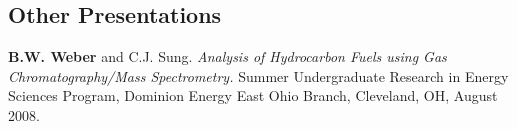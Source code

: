 \documentclass[margin,line]{res}
\newenvironment{list3}{
  \begin{list}{\ding{113}}{%
      \setlength{\itemsep}{0.1in}
      \setlength{\parsep}{0in} \setlength{\parskip}{0in}
      \setlength{\topsep}{0in} \setlength{\partopsep}{0in} 
      \setlength{\leftmargin}{0in}}}{\end{list}}
\begin{document}
\begin{resume}
\section{\sc Other Presentations}
\begin{list3}
\item[] {\bf B.W. Weber} and C.J. Sung. {\em Analysis of Hydrocarbon Fuels using Gas Chromatography/Mass Spectrometry.} Summer Undergraduate Research in Energy Sciences Program, Dominion Energy East Ohio Branch, Cleveland, OH, August 2008.
\end{list3}


\end{resume}
\end{document}
